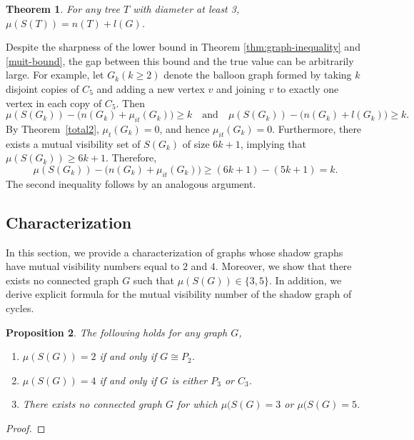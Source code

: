 \documentclass[a4paper,12pt]{article}
\newtheorem{theorem}{Theorem}[section]
\newtheorem{proposition}[theorem]{Proposition}
\begin{document}
{\begin{theorem}\label{mv-tree}
    For any tree $T$ with diameter at least 3, $\mu(S(T)) = n(T)+l(G)$. 
\end{theorem}
Despite the sharpness of the lower bound in Theorem \ref{thm:graph-inequality} and \ref{muit-bound}, the gap between this bound and the true value can be arbitrarily large. For example, let $G_k(k \geq 2)$ denote the balloon graph formed by taking $k$ disjoint copies of $C_5$ and adding a  new vertex $v$ and joining $v$ to exactly one vertex in each copy of $C_5$. Then
\[\mu(S(G_k)) - \bigl(n(G_k) + \mu_{it}(G_k)\bigr) \geq k
\quad \text{and} \quad
\mu(S(G_k)) - \bigl(n(G_k) + l(G_k)\bigr) \geq k.
\]
By Theorem~\ref{total2}, $\mu_t(G_k)=0$, and hence $\mu_{it}(G_k)=0$. 
Furthermore, there exists a mutual visibility set of $S(G_k)$ of size $6k+1$, implying that $\mu(S(G_k)) \geq 6k+1$. Therefore,
\[
\mu(S(G_k)) - \bigl(n(G_k) + \mu_{it}(G_k)\bigr)
\geq (6k+1) - (5k+1)
= k.
\]
The second inequality follows by an analogous argument.




\subsection{Characterization}
In this section, we provide a characterization of graphs whose shadow graphs have mutual visibility numbers equal to $2$ and $4$. Moreover, we show that there exists no connected graph $G$ such that $\mu(S(G)) \in \{3,5\}$. In addition, we derive explicit formula for the mutual visibility number of the shadow graph of cycles.

\begin{proposition}
    The following holds for any graph $G$,
    \begin{enumerate}[label=\roman*.]
        \item  $\mu(S(G))=2$ if and only if $G \cong P_2$.
      \item  $\mu(S(G))= 4$ if and only if $G$ is either $P_3$ or $C_3$.
    \item There exists no connected graph $G$ for which $\mu(S(G)= 3$ or $\mu(S(G)=5$.
    \end{enumerate}
\end{proposition}
\begin{proof}
  

\end{proof}}
\end{document}
